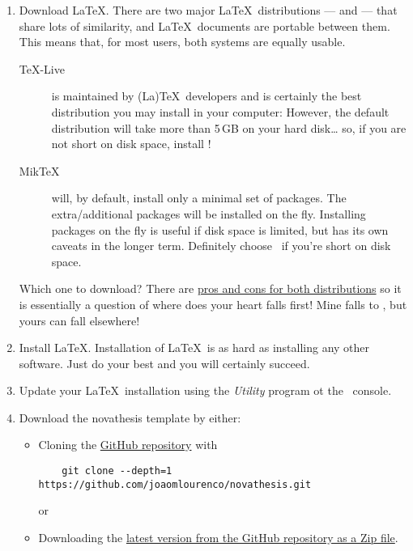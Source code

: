 \begin{enumerate}
  \item Download \LaTeX.  There are two major \LaTeX\ distributions — \href{https://miktex.org/}{\MikTeX} and \href{https://www.tug.org/texlive/}{\TeXLive} — that share lots of similarity, and \LaTeX\ documents are portable between them. This means that, for most users, both systems are equally usable.
  \begin{description}
    \item [\TeX-Live] is maintained by (La)\TeX\ developers and is certainly the best distribution you may install in your computer:  However, the default distribution will take more than 5\,GB on your hard disk… so, if you are not short on disk space, install \TeXLive!
    \item[Mik\TeX] will, by default, install only a minimal set of packages. The extra/additional packages will be installed on the fly.  Installing packages on the fly is useful if disk space is limited, but has its own caveats in the longer term.  Definitely choose \MikTeX\ if you're short on disk space.
  \end{description}
  Which one to download?  There are \href{https://tex.stackexchange.com/questions/20036/what-are-the-advantages-of-tex-live-over-miktex}{pros and cons for both distributions} so it is essentially a question of where does your heart falls first!  Mine falls to \TeXLive, but yours can fall elsewhere!  \emojiSmile
  \item Install \LaTeX. Installation of \LaTeX\ is as hard as installing any other software.  Just do your best and you will certainly succeed. 
  \item Update your \LaTeX\ installation using the \emph{\TeXLive Utility} program ot the \MikTeX\ console.
  \item Download the \gls{novathesis} template by either:
  \begin{itemize}
    \item Cloning the \href{https://github.com/joaomlourenco/novathesis}{GitHub repository} with
    \begin{verbatim}    git clone --depth=1 https://github.com/joaomlourenco/novathesis.git\end{verbatim}
    or
    \item Downloading the \href{https://github.com/joaomlourenco/novathesis/archive/main.zip}{latest version from the GitHub repository as a Zip file}.
  \end{itemize}


\end{enumerate}
